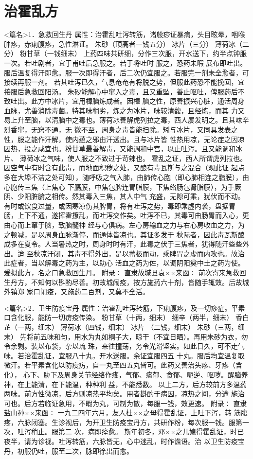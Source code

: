 \documentclass[a4paper,12pt,UTF8,twoside]{ctexbook}
\begin{document}
\chapter{治霍乱方}
<篇名>1．急救回生丹
属性：治霍乱吐泻转筋，诸般痧证暴病，头目眩晕，咽喉肿疼，赤痢腹疼，急性淋证。 
朱砂（顶高者一钱五分） 冰片（三分） 薄荷冰（二分） 粉甘草（一钱细末） 
上药四味共研细，分作三次服，开水送下，约半点钟服一次。若吐剧者，宜于甫吐后急服之。若于将吐时 
服之，恐药未暇 
展布即吐出。服后温复得汗即愈。服一次即得汗者，后二次仍宜服之。若服完一剂未全愈者，可接续再服一剂。 
若其吐泻已久，气息奄奄有将脱之势，但服此药恐不能挽回，宜接服后急救回阳汤。 
朱砂能解心中窜入之毒，且又重坠，善止呕吐，俾服药后不致吐出。此方中冰片，宜用樟脑炼成者。因樟 
脑之性，原善振兴心脏，通活周身血脉，尤善消除毒菌。特其味稍劣，炼之为冰片，味较清馥，且经炼，而其 
力又易上升至脑，以清脑中之毒也。薄荷冰善解虎列拉之毒，西人屡发明之。且其味辛烈香窜，无窍不通，无 
微不至，周身之毒皆能扫除。矧与冰片，又同具发表之性，服之能作汗解，使内蕴之邪由汗透出。且与冰片皆 
性热用凉，无论症之因凉因热，投之咸宜也。粉甘草最善解毒，又能调和中宫，以止吐泻。且又能调和冰片、 
薄荷冰之气味，使人服之不致过于苛辣也。 
霍乱之证，西人所谓虎列拉也。因空气中有时含有此毒，而地面积秽之处，又酿有毒瓦斯与之混合（观此证 
起点多在大埠不洁之处可知），随呼吸之气入肺，由肺传心胞（即心肺相连之脂膜），由心胞传三焦（上焦心 
下膈膜，中焦包脾连胃脂膜，下焦络肠包肾脂膜），为手厥阴、少阳脏腑之相传。然其毒入三焦，其人中气 
充盛，无隙可乘，犹伏而不动。有时或饮食过量，或因寒凉伤其脾胃，将有吐泻之势，毒即乘虚内袭，盘据胃 
肠，上下不通，遂挥霍撩乱，而吐泻交作矣。吐泻不已，其毒可由肠胃而入心，更由心而上窜于脑，致脑髓神 
经与心俱病。左心房输血之力与右心房收血之力，为之顿减，是以周身血脉渐停，而通体皆凉也。其证多发于 
秋际者，因此毒瓦斯酿成多在夏令。人当暑热之时，周身时时有汗，此毒之伏于三焦者，犹得随汗些些外出。迨 
至秋凉汗闭，其毒不得外出，是以蓄极而动，乘脾胃之虚而内攻也。故治此症者，当以解毒之药为主，以助心 
活血之药为佐，以调阴阳奠中土之药为使。爰拟此方，名之曰急救回生丹。 
附录∶ 
直隶故城县袁××来函∶ 
前次寄来急救回生丹方，不知何以斟酌尽善。初故城闹疫，按方施药六十剂，皆随手辄效。后故城外镇郑 
家口闹疫，又施药二百剂，又莫不全活。 


<篇名>2．卫生防疫宝丹
属性：治霍乱吐泻转筋，下痢腹疼，及一切痧症。平素口含化服，能防一切疠疫传染。 
粉甘草（十两，细末） 细辛（两半，细末） 香白芷（一两，细末） 薄荷冰（四钱，细末） 冰片 
（二钱，细末） 朱砂（三两，细末） 
先将前五味和匀，用水为丸如桐子大，晾干（不宜日晒）。再用朱砂为衣，勿令余剩。装以布袋，杂以琉 
珠，来往撞荡，务令光滑坚实。如此日久，可不走气味。若治霍乱证，宜服八十丸，开水送服。余证宜服四五 
十丸。服后均宜温复取微汗。若平素含化以防疫疠，自一丸至四五丸皆可。此药又善治头疼、牙疼（含化）， 
心下、胁下及周身关节经络作疼，气郁、痰郁、食郁、呃逆、呕哕。醒脑养神，在上能清，在下能温，种种利 
益，不能悉数。 
以上二方，后方较前方多温药两味。前方性微凉，后方则凉热平均矣。用者斟酌于病因，凉热之间，分途 
施治可也。后方若临证急用，不暇为丸，可制为散，每服一钱，效更速。 
附录∶ 
直隶盐山孙××来函∶ 
一九二四年六月，友人杜××之母得霍乱证，上吐下泻，转 
筋腹疼，六脉闭塞。生诊视后，为开卫生防疫宝丹方，共研作粉，每次服一钱。服第一次，吐泻稍止。服第二 
次，病即痊愈。 
斯年初冬，邓××之儿媳得霍乱证，时已夜半，请为诊视。吐泻转筋，六脉皆无，心中迷乱，时作谵语。治 
以卫生防疫宝丹，初服仍吐，服至二次，脉即徐出而愈。 
\end{document}
